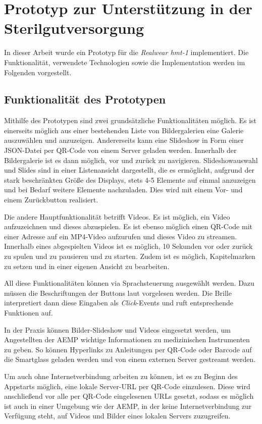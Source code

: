 %
%
%
%
%
%
\chapter{Prototyp zur Unterstützung in der Sterilgutversorgung}
\label{ch:Prototyp}
In dieser Arbeit wurde ein Prototyp für die \emph{Realwear hmt-1} implementiert. Die Funktionalität, verwendete Technologien sowie die Implementation werden im Folgenden vorgestellt.
%
%
\section{Funktionalität des Prototypen}
Mithilfe des Prototypen sind zwei grundsätzliche Funktionalitäten möglich. Es ist einerseits möglich aus einer bestehenden Liste von Bildergalerien eine Galerie auszuwählen und anzuzeigen. Andererseits kann eine Slideshow in Form einer JSON-Datei per QR-Code von einem Server geladen werden. Innerhalb der Bildergalerie ist es dann möglich, vor und zurück zu navigieren. Slideshowauswahl und Slides sind in einer Listenansicht dargestellt, die es ermöglicht, aufgrund der stark beschränkten Größe des Displays, stets 4-5 Elemente auf einmal anzuzeigen und bei Bedarf weitere Elemente nachzuladen. Dies wird mit einem Vor- und einem Zurückbutton realisiert.

Die andere Hauptfunktionalität betrifft Videos. Es ist möglich, ein Video aufzuzeichnen und dieses abzuspielen. Es ist ebenso möglich einen QR-Code mit einer Adresse auf ein MP4-Video aufzurufen und dieses Video zu streamen. Innerhalb eines abgespielten Videos ist es möglich, 10 Sekunden vor oder zurück zu spulen und zu pausieren und zu starten. Zudem ist es möglich, Kapitelmarken zu setzen und in einer eigenen Ansicht zu bearbeiten.

All diese Funktionalitäten können via Sprachsteuerung ausgewählt werden. Dazu müssen die Beschriftungen der Buttons laut vorgelesen werden. Die Brille interpretiert dann diese Eingaben als \emph{Click}-Events und ruft entsprechende Funktionen auf.

In der Praxis können Bilder-Slideshow und Videos eingesetzt werden, um Angestellten der AEMP wichtige Informationen zu medizinischen Instrumenten zu geben. So können Hyperlinks zu Anleitungen per QR-Code oder Barcode auf die Smartglass geladen werden und von einem externen Server gestreamt werden.

Um auch ohne Internetverbindung arbeiten zu können, ist es zu Beginn des Appstarts möglich, eine lokale Server-URL per QR-Code einzulesen. Diese wird anschließend vor alle per QR-Code eingelesenen URLs gesetzt, sodass es möglich ist auch in einer Umgebung wie der AEMP, in der keine Internetverbindung zur Verfügung steht, auf Videos und Bilder eines lokalen Servers zuzugreifen. 

